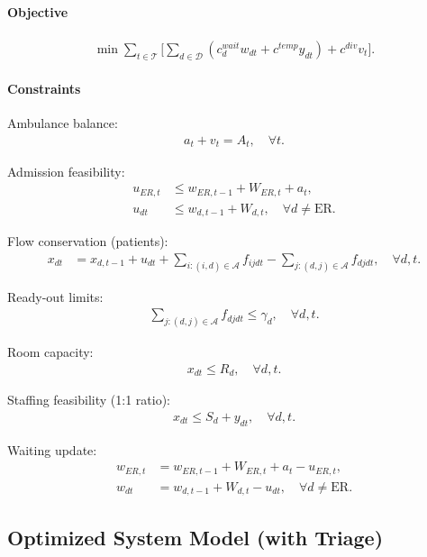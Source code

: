 \documentclass[11pt]{article}
\begin{document}
\paragraph{Objective}
\begin{align}
\min \sum_{t \in \mathcal{T}} \Bigg[
\sum_{d \in \mathcal{D}} \left( c_d^{wait} w_{dt} + c^{temp} y_{dt} \right) + c^{div} v_t \Bigg].
\end{align}

\paragraph{Constraints}

Ambulance balance:
\begin{align}
a_t + v_t = A_t, \quad \forall t.
\end{align}

Admission feasibility:
\begin{align}
u_{ER,t} &\le w_{ER,t-1} + W_{ER,t} + a_t, \\
u_{dt} &\le w_{d,t-1} + W_{d,t}, \quad \forall d \neq \text{ER}.
\end{align}

Flow conservation (patients):
\begin{align}
x_{dt} &= x_{d,t-1} + u_{dt} + \sum_{i:(i,d)\in\mathcal{A}} f_{ijdt} - \sum_{j:(d,j)\in\mathcal{A}} f_{djdt}, \quad \forall d,t.
\end{align}

Ready-out limits:
\begin{align}
\sum_{j:(d,j)\in\mathcal{A}} f_{djdt} \le \gamma_d, \quad \forall d,t.
\end{align}

Room capacity:
\begin{align}
x_{dt} \le R_d, \quad \forall d,t.
\end{align}

Staffing feasibility (1:1 ratio):
\begin{align}
x_{dt} \le S_d + y_{dt}, \quad \forall d,t.
\end{align}

Waiting update:
\begin{align}
w_{ER,t} &= w_{ER,t-1} + W_{ER,t} + a_t - u_{ER,t}, \\
w_{dt} &= w_{d,t-1} + W_{d,t} - u_{dt}, \quad \forall d \neq \text{ER}.
\end{align}

\clearpage
\subsection{Optimized System Model (with Triage)}
\end{document}
